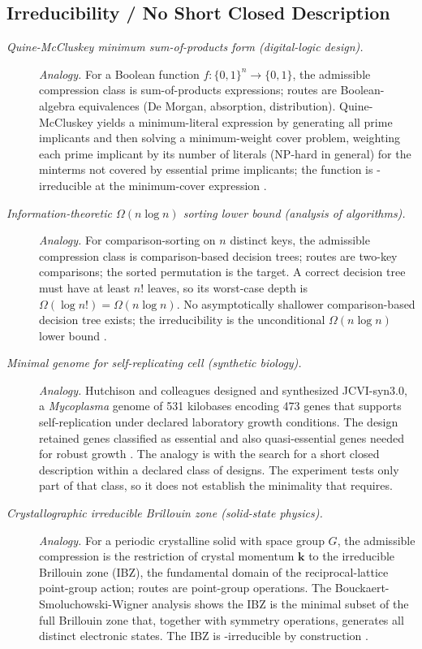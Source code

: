 \subsection*{ Irreducibility / No Short Closed Description}
\begingroup\small
\begin{description}
\item[\emph{Quine-McCluskey minimum sum-of-products
form (digital-logic design).}] \textit{Analogy.}
For a Boolean function \(f:\{0,1\}^n\to\{0,1\}\), the
admissible compression class is sum-of-products
expressions; routes are Boolean-algebra equivalences
(De Morgan, absorption, distribution).  Quine-McCluskey
yields a minimum-literal expression by generating all prime implicants and then solving a minimum-weight cover problem, weighting each prime implicant by its number of literals (NP-hard in general) for the minterms not covered by essential prime implicants; the
function is -irreducible at the minimum-cover
expression \citep{Quine1952Boolean}.

\item[\emph{Information-theoretic
\(\Omega(n\log n)\) sorting lower bound (analysis of
algorithms).}] \textit{Analogy.}
For comparison-sorting on \(n\) distinct keys, the
admissible compression class is comparison-based
decision trees; routes are two-key comparisons; the
sorted permutation is the target.  A correct decision
tree must have at least \(n!\) leaves, so its
worst-case depth is \(\Omega(\log n!) = \Omega(n\log
n)\).  No asymptotically shallower comparison-based
decision tree exists; the  irreducibility is the
unconditional \(\Omega(n\log n)\) lower bound
\citep{Knuth1998TAOCPv3}.

\item[\emph{Minimal genome for self-replicating cell
(synthetic biology).}] \textit{Analogy.}
Hutchison and colleagues designed and synthesized
JCVI-syn3.0, a \emph{Mycoplasma} genome of 531
kilobases encoding 473 genes that supports
self-replication under declared laboratory growth
conditions.  The design retained genes classified as
essential and also quasi-essential genes needed for
robust growth \citep{Hutchison2016MinimalGenome}.
The analogy is with the search for a short closed
description within a declared class of designs.  The
experiment tests only part of that class, so it does
not establish the minimality that 
requires.

\item[\emph{Crystallographic irreducible Brillouin
zone (solid-state physics).}] \textit{Analogy.}
For a periodic crystalline solid with space group
\(G\), the admissible compression is the
restriction of crystal momentum \(\mathbf k\) to the
irreducible Brillouin zone (IBZ), the fundamental
domain of the reciprocal-lattice point-group action;
routes are point-group operations.  The
Bouckaert-Smoluchowski-Wigner analysis shows the
IBZ is the minimal subset of the full Brillouin
zone that, together with symmetry operations,
generates all distinct electronic states.  The IBZ
is -irreducible by construction
\citep{BouckaertSmoluchowskiWigner1936Theory}.
\end{description}
\endgroup

